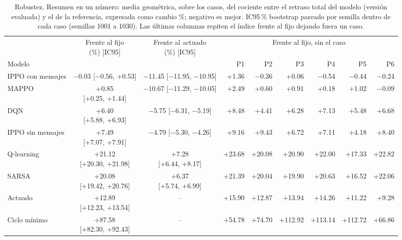 \begin{table}[H]
\centering
\scriptsize
\setlength{\tabcolsep}{3pt}
\begin{tabular}{lccrrrrrr}
\toprule
 & \makecell{Frente al fijo\\(\%) [IC95]} & \makecell{Frente al actuado\\(\%) [IC95]} & \multicolumn{6}{c}{Frente al fijo, sin el caso} \\
\cmidrule(lr){4-9}
Modelo & & & P1 & P2 & P3 & P4 & P5 & P6 \\
\midrule
IPPO con mensajes & \makecell[c]{$-$0.03\\{}[$-$0.56, +0.53]} & \makecell[c]{$-$11.45\\{}[$-$11.95, $-$10.95]} & +1.36 & $-$0.36 & +0.06 & $-$0.54 & $-$0.44 & $-$0.24 \\
MAPPO & \makecell[c]{+0.85\\{}[+0.25, +1.44]} & \makecell[c]{$-$10.67\\{}[$-$11.29, $-$10.05]} & +2.49 & +0.60 & +0.91 & +0.18 & +1.02 & $-$0.09 \\
DQN & \makecell[c]{+6.40\\{}[+5.88, +6.93]} & \makecell[c]{$-$5.75\\{}[$-$6.31, $-$5.19]} & +8.48 & +4.41 & +6.28 & +7.13 & +5.48 & +6.68 \\
IPPO sin mensajes & \makecell[c]{+7.49\\{}[+7.07, +7.91]} & \makecell[c]{$-$4.79\\{}[$-$5.30, $-$4.26]} & +9.16 & +9.43 & +6.72 & +7.11 & +4.18 & +8.40 \\
Q-learning & \makecell[c]{+21.12\\{}[+20.30, +21.98]} & \makecell[c]{+7.28\\{}[+6.44, +8.17]} & +23.68 & +20.08 & +20.90 & +22.00 & +17.33 & +22.82 \\
SARSA & \makecell[c]{+20.08\\{}[+19.42, +20.76]} & \makecell[c]{+6.37\\{}[+5.74, +6.99]} & +21.39 & +20.04 & +19.90 & +20.63 & +16.52 & +22.06 \\
Actuado & \makecell[c]{+12.89\\{}[+12.23, +13.54]} & -- & +15.90 & +12.87 & +13.94 & +14.26 & +11.22 & +9.28 \\
Ciclo mínimo & \makecell[c]{+87.58\\{}[+82.30, +92.43]} & -- & +54.78 & +74.70 & +112.92 & +113.14 & +112.72 & +66.86 \\
\bottomrule
\end{tabular}
\caption[Robustez: resumen en un número]{Robustez. Resumen en un número: media geométrica, sobre los casos, del cociente entre el retraso total del modelo (versión evaluada) y el de la referencia, expresada como cambio \%; negativo es mejor. IC95\,\% bootstrap pareado por semilla dentro de cada caso (semillas 1001 a 1030). Las últimas columnas repiten el índice frente al fijo dejando fuera un caso.}
\label{tab:robustez-numero-unico}
\end{table}
